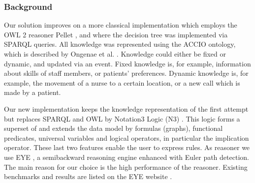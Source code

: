 \subsubsection{Background}
Our solution improves on a more classical implementation which employs the OWL 2 reasoner Pellet \cite{Pellet}, and where
the decision tree was implemented via SPARQL queries.
All knowledge was represented using the ACCIO ontology, which is described %
by Ongenae et al. \cite{accioont}. 
Knowledge could either be fixed or dynamic, and updated via an event.
Fixed knowledge is, for example, information about skills of staff members, or patients' preferences.
Dynamic knowledge is, for example, the movement
of a nurse to a certain location, or a new call which is made by a patient.

Our new implementation keeps the knowledge representation of the first attempt but replaces SPARQL and OWL by Notation3 Logic (N3) \cite{N3Logic}.
This logic forms a superset of \rdf and extends the \rdf data model by formulas (graphs), functional predicates, universal variables and logical operators, in particular
the implication operator. %
These last two features enable the user to express rules. %
As %
reasoner we use EYE \cite{eyepaper}, a semibackward reasoning engine enhanced with Euler path detection. 
The main reason for our choice is the high performance of the reasoner. Existing benchmarks and results are listed on the EYE website \cite{eye}. %
%



